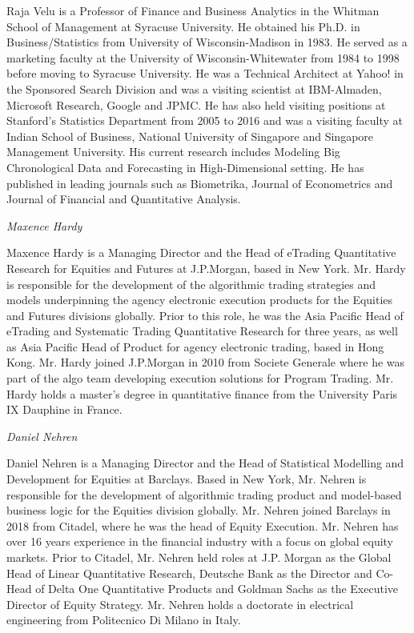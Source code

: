 \noindent Raja Velu is a Professor of Finance and Business Analytics in the Whitman School of Management at Syracuse University. He obtained his Ph.D. in Business/Statistics from University of Wisconsin-Madison in 1983. He served as a marketing faculty at the University of Wisconsin-Whitewater from 1984 to 1998 before moving to Syracuse University. He was a Technical Architect at Yahoo! in the Sponsored Search Division and was a visiting scientist at IBM-Almaden, Microsoft Research, Google and JPMC. He has also held visiting positions at Stanford's Statistics Department from 2005 to 2016 and was a visiting faculty at Indian School of Business, National University of Singapore and Singapore Management University. His current research includes Modeling Big Chronological Data and Forecasting in High-Dimensional setting. He has published in leading journals such as Biometrika, Journal of Econometrics and Journal of Financial and Quantitative Analysis. \bigbreak

{\noindent\large\itshape Maxence Hardy} \medbreak

\noindent Maxence Hardy is a Managing Director and the Head of eTrading Quantitative Research for Equities and Futures at J.P.Morgan, based in New York. Mr. Hardy is responsible for the development of the algorithmic trading strategies and models underpinning the agency electronic execution products for the Equities and Futures divisions globally. Prior to this role, he was the Asia Pacific Head of eTrading and Systematic Trading Quantitative Research for three years, as well as Asia Pacific Head of Product for agency electronic trading, based in Hong Kong. Mr. Hardy joined J.P.Morgan in 2010 from Societe Generale where he was part of the algo team developing execution solutions for Program Trading. Mr. Hardy holds a master's degree in quantitative finance from the University Paris IX Dauphine in France. \bigbreak

{\noindent\large\itshape Daniel Nehren} \medbreak

\noindent Daniel Nehren is a Managing Director and the Head of Statistical Modelling and Development for Equities at Barclays. Based in New York, Mr. Nehren is responsible for the development of algorithmic trading product and model-based business logic for the Equities division globally. Mr. Nehren joined Barclays in 2018 from Citadel, where he was the head of Equity Execution. Mr. Nehren has over 16 years experience in the financial industry with a focus on global equity markets. Prior to Citadel, Mr. Nehren held roles at J.P. Morgan as the Global Head of Linear Quantitative Research, Deutsche Bank as the Director and Co-Head of Delta One Quantitative Products and Goldman Sachs as the Executive Director of Equity Strategy. Mr. Nehren holds a doctorate in electrical engineering from Politecnico Di Milano in Italy.



